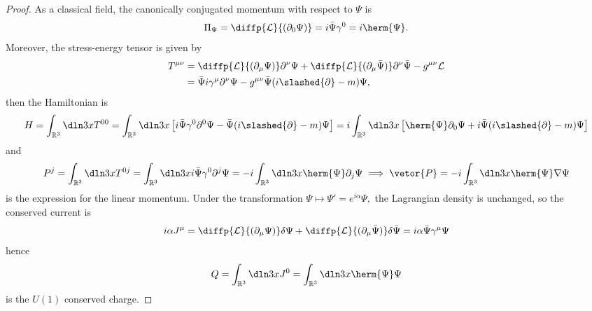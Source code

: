 \begin{proof}
   As a classical field, the canonically conjugated momentum with respect to \(\Psi\) is
   \begin{equation*}
      \Pi_{\Psi} = \diffp{\mathcal{L}}{(\partial_0 \Psi)} = i\bar{\Psi} \gamma^0 = i \herm{\Psi}.
   \end{equation*}
   Moreover, the stress-energy tensor is given by
   \begin{align*}
      T^{\mu \nu} &= \diffp{\mathcal{L}}{(\partial_\mu \Psi)} \partial^\nu \Psi + \diffp{\mathcal{L}}{(\partial_\mu \bar{\Psi})} \partial^\nu \bar{\Psi} - g^{\mu\nu} \mathcal{L}\\
                  &= \bar{\Psi} i \gamma^\mu \partial^\nu \Psi - g^{\mu\nu} \bar{\Psi}(i \slashed{\partial} - m) \Psi,
   \end{align*}
   then the Hamiltonian is
   \begin{equation*}
      H = \int_{\mathbb{R}^3} \dln3x T^{00} = \int_{\mathbb{R}^3} \dln3x \left[i \bar{\Psi} \gamma^0 \partial^0 \Psi - \bar{\Psi}(i \slashed{\partial} - m) \Psi\right] = i \int_{\mathbb{R}^3} \dln3x  \left[\herm{\Psi} \partial_0 \Psi + i \bar{\Psi}(i \slashed{\partial} - m)\Psi\right]
   \end{equation*}
   and
   \begin{equation*}
      P^j = \int_{\mathbb{R}^3} \dln3x T^{0j} = \int_{\mathbb{R}^3} \dln3x i \bar{\Psi} \gamma^0 \partial^j \Psi = -i \int_{\mathbb{R}^3} \dln3x \herm{\Psi} \partial_j \Psi \implies \vetor{P} = -i \int_{\mathbb{R}^3} \dln3x \herm{\Psi} \nabla \Psi
   \end{equation*}
   is the expression for the linear momentum. Under the transformation \(\Psi \mapsto \Psi' = e^{i\alpha} \Psi,\) the Lagrangian density is unchanged, so the conserved current is
   \begin{equation*}
      i\alpha J^\mu = \diffp{\mathcal{L}}{(\partial_\mu \Psi)} \delta \Psi + \diffp{\mathcal{L}}{(\partial_\mu \bar{\Psi})} \delta\bar{\Psi} = i \alpha \bar{\Psi} \gamma^\mu \Psi
   \end{equation*}
   hence 
   \begin{equation*}
      Q = \int_{\mathbb{R}^3} \dln3x J^0 = \int_{\mathbb{R}^3} \dln3x \herm{\Psi}\Psi
   \end{equation*}
   is the \(U(1)\) conserved charge.


\end{proof}
